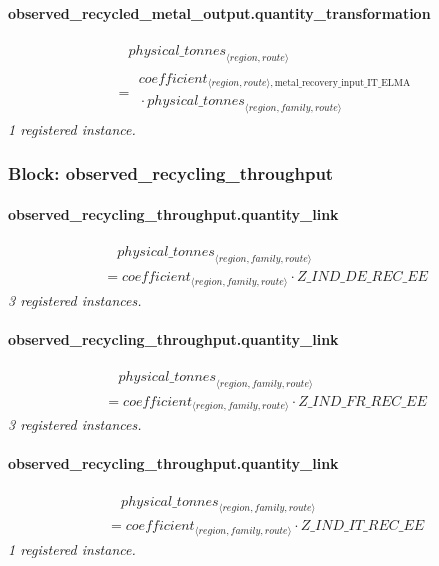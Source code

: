 \documentclass[11pt]{article}
\begin{document}
\paragraph{observed\_recycled\_metal\_output.quantity\_transformation}
\begin{align*}
&\quad {physical\_tonnes}_{\langle region, route\rangle}\\
&= \begin{aligned}
coefficient_{\langle region, route\rangle,\text{metal\_recovery\_input\_IT\_ELMA}}\\
{}\cdot {physical\_tonnes}_{\langle region, family, route\rangle}
\end{aligned}
\end{align*}
\noindent\emph{1 registered instance.}\par
\subsubsection*{Block: observed\_recycling\_throughput}
\paragraph{observed\_recycling\_throughput.quantity\_link}
\begin{align*}
&\quad {physical\_tonnes}_{\langle region, family, route\rangle}\\
&= coefficient_{\langle region, family, route\rangle} \cdot Z\_IND\_DE\_REC\_EE
\end{align*}
\noindent\emph{3 registered instances.}\par
\paragraph{observed\_recycling\_throughput.quantity\_link}
\begin{align*}
&\quad {physical\_tonnes}_{\langle region, family, route\rangle}\\
&= coefficient_{\langle region, family, route\rangle} \cdot Z\_IND\_FR\_REC\_EE
\end{align*}
\noindent\emph{3 registered instances.}\par
\paragraph{observed\_recycling\_throughput.quantity\_link}
\begin{align*}
&\quad {physical\_tonnes}_{\langle region, family, route\rangle}\\
&= coefficient_{\langle region, family, route\rangle} \cdot Z\_IND\_IT\_REC\_EE
\end{align*}
\noindent\emph{1 registered instance.}\par
\end{document}
